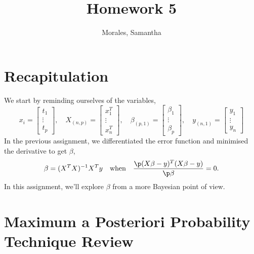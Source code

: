 \documentclass{homework}
\author{Morales, Samantha}
\title{Homework 5}
\begin{document}
 \maketitle

\section{Recapitulation}

We start by reminding ourselves of the variables,
\[
  x_i =
  \begin{bmatrix}%
    t_1 \\ \vdots \\ t_{p}
  \end{bmatrix},
  \quad
  X_{(n, p)} =
  \begin{bmatrix}
    x^T_1 \\ \vdots \\ x^T_n
  \end{bmatrix},
  \quad
  \beta_{(p, 1)} =
  \begin{bmatrix}
    \beta_1 \\ \vdots \\ \beta_p
  \end{bmatrix},
  \quad
  y_{(n, 1)} =
  \begin{bmatrix}
    y_1 \\ \vdots \\ y_n
  \end{bmatrix}
\]
In the previous assignment, we differentiated the error function and
minimised the derivative to get $\beta$,
\[
  \beta = (X^TX)^{-1}X^Ty
  \quad\text{when}\quad
  \frac{\p (X\beta - y)^T(X\beta - y)}{\p \beta} = 0.
\]
In this assignment, we'll explore $\beta$ from a more Bayesian point of view.

\section{Maximum a Posteriori Probability Technique Review}
\end{document}
